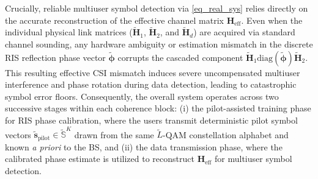 \documentclass[conference]{IEEEtran}
\begin{document}
Crucially, reliable multiuser symbol detection via \eqref{eq_real_sys} relies directly on the accurate reconstruction of the effective channel matrix $\mathbf{H}_{\mathrm{eff}}$. Even when the individual physical link matrices ($\tilde{\mathbf{H}}_1$, $\tilde{\mathbf{H}}_2$, and $\tilde{\mathbf{H}}_d$) are acquired via standard channel sounding, any hardware ambiguity or estimation mismatch in the discrete RIS reflection phase vector $\tilde{\boldsymbol{\phi}}$ corrupts the cascaded component $\tilde{\mathbf{H}}_1 \mathrm{diag}(\tilde{\boldsymbol{\phi}}) \tilde{\mathbf{H}}_2$. This resulting effective CSI mismatch induces severe uncompensated multiuser interference and phase rotation during data detection, leading to catastrophic symbol error floors. Consequently, the overall system operates across two successive stages within each coherence block: (i) the pilot-assisted training phase for RIS phase calibration, where the users transmit deterministic pilot symbol vectors $\tilde{\mathbf{s}}_{\mathrm{pilot}} \in \tilde{\mathbb{S}}^K$ drawn from the same $\tilde{L}$-QAM constellation alphabet and known \textit{a priori} to the BS, and (ii) the data transmission phase, where the calibrated phase estimate is utilized to reconstruct $\mathbf{H}_{\mathrm{eff}}$ for multiuser symbol detection.
\end{document}
